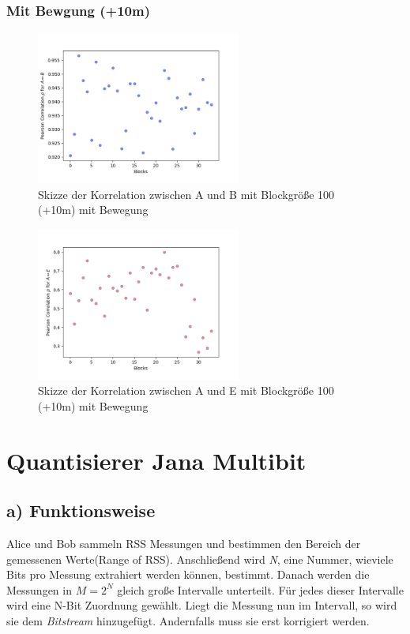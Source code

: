 \documentclass[12pt,a4paper]{article}
\begin{document}
\subsubsection*{Mit Bewgung (+10m)}


\begin{figure}[hbt!]
	\centering
		\includegraphics[width=0.6\textwidth ]
		{Bilder/a3-t3b-mb-block100-correlation-AB.png}
		\caption{Skizze der Korrelation zwischen A und B mit Blockgröße 100 (+10m) mit Bewegung}
		\label{fig:Label14}
\end{figure}

\begin{figure}[hbt!]
	\centering
		\includegraphics[width=0.6\textwidth ]
		{Bilder/a3-t3b-mb-block100-correlation-AE.png}
		\caption{Skizze der Korrelation zwischen A und E mit Blockgröße 100 (+10m) mit Bewegung}
		\label{fig:Label15}
\end{figure}




\newpage
\section{Quantisierer Jana Multibit}
\subsection*{a) Funktionsweise}
Alice und Bob sammeln RSS Messungen und bestimmen den Bereich der gemessenen Werte(Range of RSS). Anschließend wird \textit{N}, eine Nummer, wieviele Bits pro Messung extrahiert werden können, bestimmt. Danach werden die Messungen in $M = 2^N$ gleich große Intervalle unterteilt. Für jedes dieser Intervalle wird eine N-Bit Zuordnung gewählt. Liegt die Messung nun im Intervall, so wird sie dem \textit{Bitstream} hinzugefügt. Andernfalls muss sie erst korrigiert werden.
\end{document}
